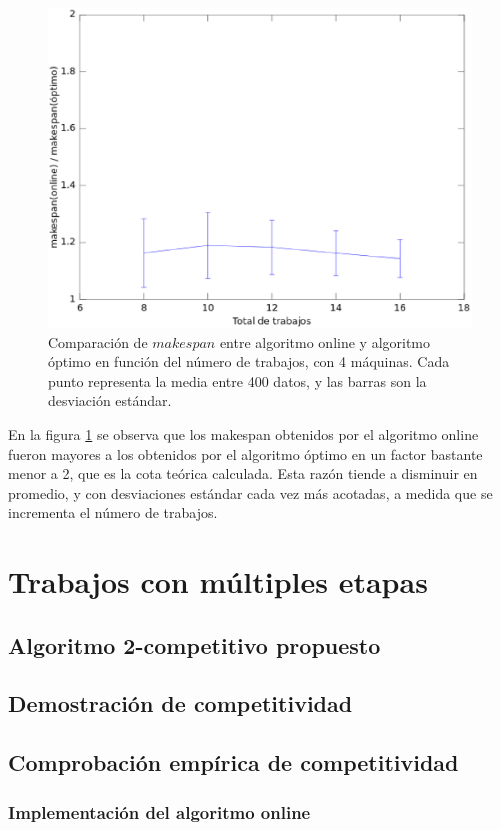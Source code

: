 \documentclass[12pt,letterpaper]{article}
\begin{document}
\begin{figure}[ht]
\centering
\includegraphics[scale=0.75]{fig1.eps}
\caption{Comparación de $makespan$ entre algoritmo online y algoritmo óptimo en función del número de trabajos, con 4 máquinas. Cada punto representa la media entre 400 datos, y las barras son la desviación estándar.}
\label{fig:1}
\end{figure}

En la figura \ref{fig:1} se observa que los makespan obtenidos por el algoritmo online fueron mayores a los obtenidos por el algoritmo óptimo en un factor bastante menor a 2, que es la cota teórica calculada. Esta razón tiende a disminuir en promedio, y con desviaciones estándar cada vez más acotadas, a medida que se incrementa el número de trabajos.

\section{Trabajos con múltiples etapas}
\subsection{Algoritmo 2-competitivo propuesto}
\subsection{Demostración de competitividad}
\subsection{Comprobación empírica de competitividad}
\subsubsection{Implementación del algoritmo online}
\end{document}
